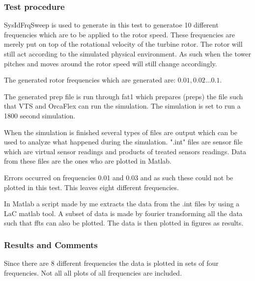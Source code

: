 \subsubsection*{Test procedure}
SysIdFrqSweep is used to generate in this test to generatoe 10 different frequencies which are to be applied to the rotor speed. These frequencies are merely put on top of the rotational velocity of the turbine rotor. The rotor will still act according to the simulated physical environment. As such when the tower pitches and moves around the rotor speed will still change accordingly.

The generated rotor frequencies which are generated  are: $0.01, 0.02 ... 0.1$.

The generated prep file is run through fat1 which prepares (preps) the file such that VTS and OrcaFlex can run the simulation. The simulation is set to run a 1800 second simulation.

When the simulation is finished several types of files are output which can be used to analyze what happened during the simulation. ".int" files are sensor file which are virtual sensor readings and products of treated sensors readings. Data from these files are the ones who are plotted in Matlab.

Errors occurred on frequencies 0.01 and 0.03 and as such these could not be plotted in this test. This leaves eight different frequencies.

In Matlab a script made by me extracts the data from the .int files by using a LaC matlab tool. A subset of data is made by fourier transforming all the data such that ffts can also be plotted. The data is then plotted in figures as results.


\subsubsection*{Results and Comments}
Since there are 8 different frequencies the data is plotted in sets of four frequencies. Not all all plots of all frequencies are included. 

